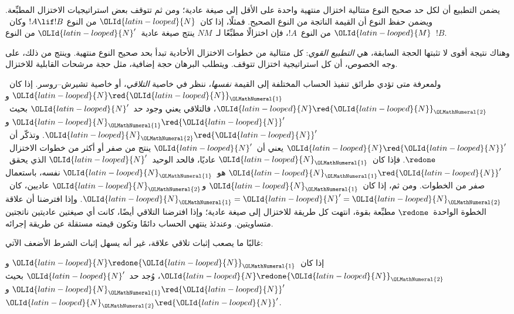 \documentclass[../../../include/open-logic-section]{subfiles}
\begin{document}
يضمن التطبيع أن لكل حد صحيح النوع متتالية اختزال منتهية واحدة على الأقل إلى
صيغة عادية؛ ومن ثم تتوقف بعض استراتيجيات الاختزال المطبِّعة. ويضمن حفظ النوع
أن القيمة الناتجة من النوع الصحيح. فمثلًا، إذا كان~${\OLId{latin-looped}{N}}$ من النوع
$!A\lif !B$ وكان~${\OLId{latin-looped}{M}}$ من النوع~$!A$، فإن اختزالًا مطبِّعًا لـ~$NM$ ينتج
صيغة عادية~${\OLId{latin-looped}{N}}'$ من النوع~$!B$.

وهناك نتيجة أقوى لا تثبتها الحجة السابقة، هي \emph{التطبيع القوي}: كل
متتالية من خطوات الاختزال الأحادية تبدأ بحد صحيح النوع منتهية. وينتج من ذلك،
على وجه الخصوص، أن كل استراتيجية اختزال تتوقف. ويتطلب البرهان حجة إضافية،
مثل حجة مرشحات القابلية للاختزال.

ولمعرفة متى تؤدي طرائق تنفيذ الحساب المختلفة إلى القيمة \emph{نفسها}، ننظر
في خاصية \emph{التلاقي}، أو خاصية تشيرش--روسر. إذا كان~${\OLId{latin-looped}{N}}\red {\OLId{latin-looped}{N}}_{\OLMathNumeral{1}}$ و
${\OLId{latin-looped}{N}}\red {\OLId{latin-looped}{N}}_{\OLMathNumeral{2}}$، فالتلاقي يعني وجود حد~${\OLId{latin-looped}{N}}'$ بحيث~${\OLId{latin-looped}{N}}_{\OLMathNumeral{1}}\red {\OLId{latin-looped}{N}}'$ و
${\OLId{latin-looped}{N}}_{\OLMathNumeral{2}}\red {\OLId{latin-looped}{N}}'$. وتذكّر أن~${\OLId{latin-looped}{N}}\red {\OLId{latin-looped}{N}}'$ يعني أن~${\OLId{latin-looped}{N}}'$ ينتج من صفر أو أكثر من
خطوات الاختزال~$\redone$. فإذا كان~${\OLId{latin-looped}{N}}_{\OLMathNumeral{1}}$ عاديًا، فالحد الوحيد~${\OLId{latin-looped}{N}}'$ الذي
يحقق~${\OLId{latin-looped}{N}}_{\OLMathNumeral{1}}\red {\OLId{latin-looped}{N}}'$ هو~${\OLId{latin-looped}{N}}_{\OLMathNumeral{1}}$ نفسه، باستعمال صفر من الخطوات. ومن ثم، إذا
كان~${\OLId{latin-looped}{N}}_{\OLMathNumeral{1}}$ و${\OLId{latin-looped}{N}}_{\OLMathNumeral{2}}$ عاديين، كان~${\OLId{latin-looped}{N}}_{\OLMathNumeral{1}}={\OLId{latin-looped}{N}}'={\OLId{latin-looped}{N}}_{\OLMathNumeral{2}}$. وإذا افترضنا أن علاقة الخطوة
الواحدة~$\redone$ مطبِّعة بقوة، انتهت كل طريقة للاختزال إلى صيغة عادية؛
وإذا افترضنا التلاقي أيضًا، كانت أي صيغتين عاديتين ناتجتين متساويتين. وعندئذ
ينتهي الحساب دائمًا وتكون قيمته مستقلة عن طريقة إجرائه.

غالبًا ما يصعب إثبات تلاقي علاقة، غير أنه يسهل إثبات الشرط الأضعف الآتي:

\begin{prop}
إذا كان~${\OLId{latin-looped}{N}}\redone {\OLId{latin-looped}{N}}_{\OLMathNumeral{1}}$ و${\OLId{latin-looped}{N}}\redone {\OLId{latin-looped}{N}}_{\OLMathNumeral{2}}$، وُجد حد~${\OLId{latin-looped}{N}}'$ بحيث
${\OLId{latin-looped}{N}}_{\OLMathNumeral{1}}\red {\OLId{latin-looped}{N}}'$ و${\OLId{latin-looped}{N}}_{\OLMathNumeral{2}}\red {\OLId{latin-looped}{N}}'$.
\end{prop}
\end{document}
